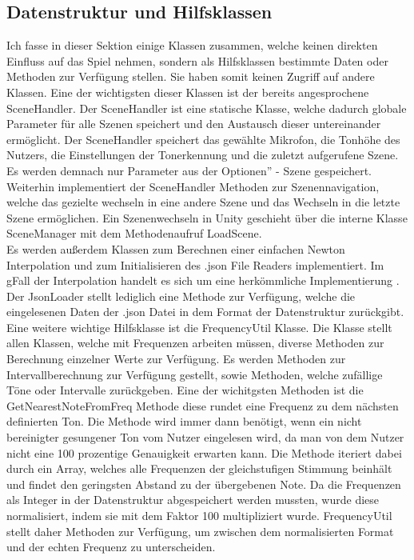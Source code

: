 \subsection*{Datenstruktur und Hilfsklassen}
Ich fasse in dieser Sektion einige Klassen zusammen, welche keinen direkten Einfluss auf das Spiel nehmen, sondern als Hilfsklassen bestimmte Daten oder Methoden zur Verfügung stellen. Sie haben somit keinen Zugriff auf andere Klassen. Eine der wichtigsten dieser Klassen ist der bereits angesprochene SceneHandler. Der SceneHandler ist eine statische Klasse, welche dadurch globale Parameter für alle Szenen speichert und den Austausch dieser untereinander ermöglicht. Der SceneHandler speichert das gewählte Mikrofon, die Tonhöhe des Nutzers, die Einstellungen der Tonerkennung und die zuletzt aufgerufene Szene. Es werden demnach nur Parameter aus der \glqq Optionen'' - Szene gespeichert. Weiterhin implementiert der SceneHandler Methoden zur Szenennavigation, welche das gezielte wechseln in eine andere Szene und das Wechseln in die letzte Szene ermöglichen. Ein Szenenwechseln in Unity geschieht über die interne Klasse SceneManager mit dem Methodenaufruf LoadScene. \\
Es werden außerdem Klassen zum Berechnen einer einfachen Newton Interpolation und zum Initialisieren des .json File Readers implementiert. Im  gFall der Interpolation handelt es sich um eine herkömmliche Implementierung \cite{newtonInterpolation}. Der JsonLoader stellt lediglich eine Methode zur Verfügung, welche die eingelesenen Daten der .json Datei in dem Format der Datenstruktur zurückgibt. \\
Eine weitere wichtige Hilfsklasse ist die FrequencyUtil Klasse. Die Klasse stellt allen Klassen, welche mit Frequenzen arbeiten müssen, diverse Methoden zur Berechnung einzelner Werte zur Verfügung. Es werden Methoden zur Intervallberechnung zur Verfügung gestellt, sowie Methoden, welche zufällige Töne oder Intervalle zurückgeben. Eine der wichitgsten Methoden ist die GetNearestNoteFromFreq Methode diese rundet eine Frequenz zu dem nächsten definierten Ton. Die Methode wird immer dann benötigt, wenn ein nicht bereinigter gesungener Ton vom Nutzer eingelesen wird, da man von dem Nutzer nicht eine 100 prozentige Genauigkeit erwarten kann. Die Methode iteriert dabei durch ein Array, welches alle Frequenzen der gleichstufigen Stimmung beinhält und findet den geringsten Abstand zu der übergebenen Note. Da die Frequenzen als Integer in der Datenstruktur abgespeichert werden mussten, wurde diese normalisiert, indem sie mit dem Faktor 100 multipliziert wurde. FrequencyUtil stellt daher Methoden zur Verfügung, um zwischen dem normalisierten Format und der echten Frequenz zu unterscheiden. \\
